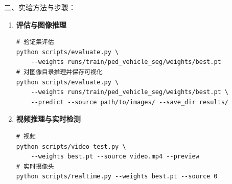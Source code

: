 \documentclass[12pt, a4paper]{article}
\begin{document}
\begin{labbox}{二、实验方法与步骤：}{}
\begin{enumerate}[leftmargin=2em, itemsep=0.5em]
    \item \textbf{评估与图像推理}

\begin{lstlisting}
# 验证集评估
python scripts/evaluate.py \
    --weights runs/train/ped_vehicle_seg/weights/best.pt
# 对图像目录推理并保存可视化
python scripts/evaluate.py \
    --weights runs/train/ped_vehicle_seg/weights/best.pt \
    --predict --source path/to/images/ --save_dir results/
\end{lstlisting}

    \item \textbf{视频推理与实时检测}

\begin{lstlisting}
# 视频
python scripts/video_test.py \
    --weights best.pt --source video.mp4 --preview
# 实时摄像头
python scripts/realtime.py --weights best.pt --source 0
\end{lstlisting}

\end{enumerate}

\end{labbox}
\end{document}
